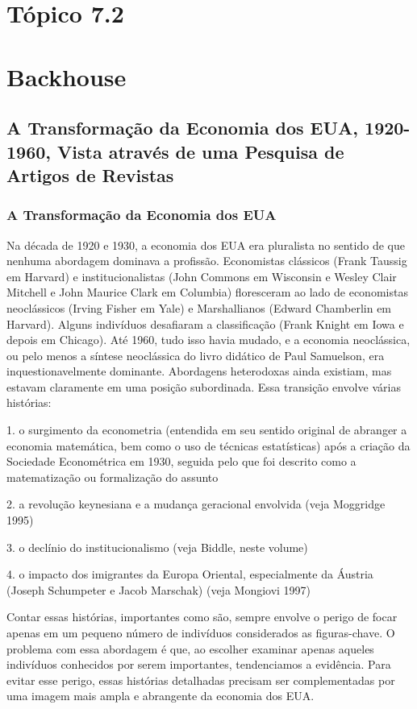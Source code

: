 \documentclass[12pt]{article}
\begin{document}
\newpage
\section*{\textbf{Tópico 7.2}}
\section{\textbf{Backhouse}}

\subsection{\textbf{A Transformação da Economia dos EUA, 1920-1960, Vista através de uma Pesquisa de Artigos de Revistas}}

\subsubsection{\textbf{A Transformação da Economia dos EUA}}

Na década de 1920 e 1930, a economia dos EUA era pluralista no sentido de que nenhuma abordagem dominava a profissão. Economistas clássicos (Frank Taussig em Harvard) e institucionalistas (John Commons em Wisconsin e Wesley Clair Mitchell e John Maurice Clark em Columbia) floresceram ao lado de economistas neoclássicos (Irving Fisher em Yale) e Marshallianos (Edward Chamberlin em Harvard). Alguns indivíduos desafiaram a classificação (Frank Knight em Iowa e depois em Chicago). Até 1960, tudo isso havia mudado, e a economia neoclássica, ou pelo menos a síntese neoclássica do livro didático de Paul Samuelson, era inquestionavelmente dominante. Abordagens heterodoxas ainda existiam, mas estavam claramente em uma posição subordinada. Essa transição envolve várias histórias:

1. o surgimento da econometria (entendida em seu sentido original de abranger a economia matemática, bem como o uso de técnicas estatísticas) após a criação da Sociedade Econométrica em 1930, seguida pelo que foi descrito como a matematização ou formalização do assunto

2. a revolução keynesiana e a mudança geracional envolvida (veja Moggridge 1995)

3. o declínio do institucionalismo (veja Biddle, neste volume)

4. o impacto dos imigrantes da Europa Oriental, especialmente da Áustria (Joseph Schumpeter e Jacob Marschak) (veja Mongiovi 1997)

Contar essas histórias, importantes como são, sempre envolve o perigo de focar apenas em um pequeno número de indivíduos considerados as figuras-chave. O problema com essa abordagem é que, ao escolher examinar apenas aqueles indivíduos conhecidos por serem importantes, tendenciamos a evidência. Para evitar esse perigo, essas histórias detalhadas precisam ser complementadas por uma imagem mais ampla e abrangente da economia dos EUA.
\end{document}
